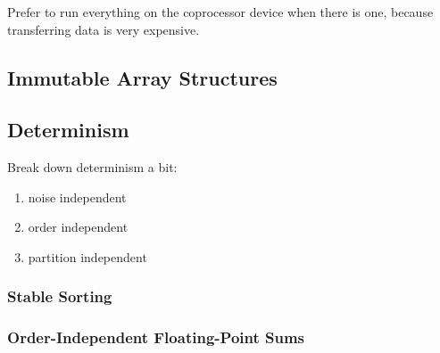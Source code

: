 Prefer to run everything on the coprocessor device
when there is one, because transferring data
is very expensive.

\subsection{Immutable Array Structures}

\subsection{Determinism}

Break down determinism a bit:
\begin{enumerate}
\item noise independent
\item order independent
\item partition independent
\end{enumerate}

\subsubsection{Stable Sorting}

\subsubsection{Order-Independent Floating-Point Sums}

